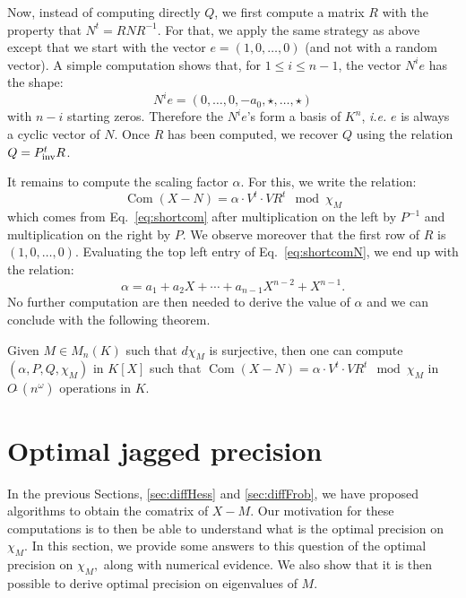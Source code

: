 \documentclass{sig-alternate-05-2015}
\DeclareMathOperator{\com}{Com}
\newcommand{\softO}{O\tilde{~}}
\newcommand{\inv}{\text{\rm inv}}
\begin{document}
Now, instead of computing directly $Q$, we first compute a matrix $R$ 
with the property that $N^t = R N R^{-1}$. For that, we apply the same
strategy as above except that we start with the vector $e = (1, 0, 
\ldots, 0)$ (and not with a random vector). A simple computation shows
that, for $1 \leq i \leq n{-}1$, the vector $N^i e$ has the shape:
$$N^i e = (0, \ldots, 0, -a_0, \star, \ldots, \star)$$
with $n{-}i$ starting zeros. Therefore the $N^i e$'s form a basis of
$K^n$, \emph{i.e.} $e$ is always a cyclic vector of $N$. Once $R$ has
been computed, we recover $Q$ using the relation $Q = P_\inv^t R$.

It remains to compute the scaling factor $\alpha$. For this, we write
the relation:
\begin{equation}
\label{eq:shortcomN}
\com(X{-}N) = \alpha \cdot V^t \cdot V R^t \mod \chi_M
\end{equation}
which comes from Eq.~\eqref{eq:shortcom} after multiplication on the 
left by $P^{-1}$ and multiplication on the right by $P$. We observe
moreover that the first row of $R$ is $(1, 0, \ldots, 0)$. Evaluating
the top left entry of Eq.~\eqref{eq:shortcomN}, we end up with the 
relation:
$$\alpha = a_1 + a_2 X + \cdots + a_{n-1} X^{n-2} + X^{n-1}.$$
No further computation are then needed to derive the value of $\alpha$
and we can conclude with the following theorem.

\begin{theo}
Given $M \in M_n(K)$ such that $d \chi_M$ is surjective,
then one can compute $(\alpha, P, Q, \chi_M)$
in $K[X]$ such that
$\com(X{-}N) = \alpha \cdot V^t \cdot V R^t \mod \chi_M$
in $\softO(n^\omega)$ operations in $K.$
\end{theo}



\section{Optimal jagged precision}
\label{sec:optjagged}

In the previous Sections, \ref{sec:diffHess} and \ref{sec:diffFrob},
we have proposed algorithms to obtain the comatrix of 
$X-M.$ Our motivation for these computations is to then
be able to understand what is the optimal precision on $\chi_M.$
In this section, we provide some answers to this question of
the optimal precision on $\chi_M,$ along with
numerical evidence.
We also show that it is then possible to derive 
optimal precision on eigenvalues of $M.$ 
\end{document}
